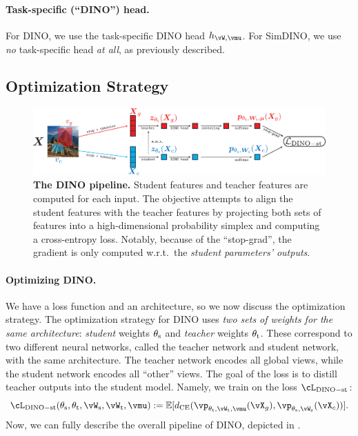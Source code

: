 \documentclass[../../book-main.tex]{subfiles}
\begin{document}
\paragraph{Task-specific (``DINO'') head.} For DINO, we use the task-specific DINO head \(h_{\vW, \vmu}\). For SimDINO, we use \textit{no} task-specific head \textit{at all}, as previously described.

\subsection{Optimization Strategy}\label{sub:contrastive_learning_optimization}

\begin{figure}
    \centering 
    \includegraphics[width=\textwidth]{figs_chap7/dino_pipeline.pdf}
    \caption{\small \textbf{The DINO pipeline.} Student features and teacher features are computed for each input. The objective attempts to align the student features with the teacher features by projecting both sets of features into a high-dimensional probability simplex and computing a cross-entropy loss. Notably, because of the ``stop-grad'', the gradient is only computed w.r.t.~the \textit{student parameters' outputs}.}
    \label{fig:dino_pipeline}
\end{figure}

\paragraph{Optimizing DINO.} We have a loss function and an architecture, so we now discuss the optimization strategy. The optimization strategy for DINO uses \textit{two sets of weights for the same architecture}: \textit{student} weights \(\theta_{\mathrm{s}}\) and \textit{teacher} weights \(\theta_{\mathrm{t}}\). These correspond to two different neural networks, called the teacher network and student network, with the same architecture. The teacher network encodes all global views, while the student network encodes all ``other'' views. The goal of the loss is to distill teacher outputs into the student model. Namely, we train on the loss \(\cL_{\dino{}-\student\teacher}\):
\begin{equation}\label{eq:dino_loss_teacherstudent}
    \cL_{\dino{}-\student\teacher}(\theta_{\student}, \theta_{\teacher}, \vW_{\student}, \vW_{\teacher}, \vmu) := \Ex[d_{\CE}(\vp_{\theta_{\teacher}, \vW_{\teacher}, \vmu}(\vX_{g}), \vp_{\theta_{\student}, \vW_{\student}}(\vX_{c}))].
\end{equation}
Now, we can fully describe the overall pipeline of DINO, depicted in .
\end{document}
